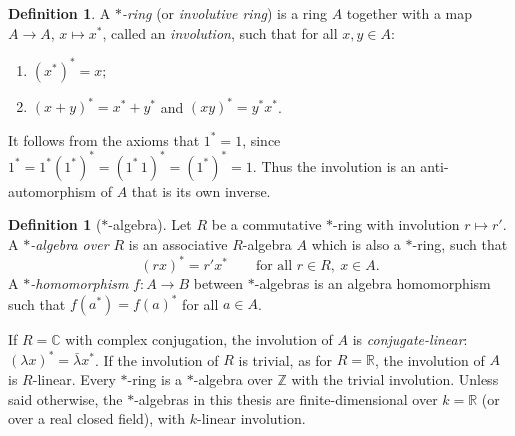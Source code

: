\documentclass[12pt, a4paper]{report}
\theoremstyle{plain}
\theoremstyle{definition}
\newtheorem{definition}[theorem]{Definition}
\theoremstyle{remark}
\theoremstyle{plain}
\newcommand{\staralg}[0]{$*$-algebra}
\newcommand{\starring}[0]{$*$-ring}
\newcommand{\RR}{\mathbb{R}}
\newcommand{\CC}{\mathbb{C}}
\newcommand{\ZZ}{\mathbb{Z}}
\begin{document}
\begin{definition}\label{def:starring}
A \emph{\starring} (or \emph{involutive ring}) is a ring $A$ together with a map $A\to A$, $x\mapsto x^*$, called an \emph{involution}, such that for all $x,y\in A$:
\begin{enumerate}
    \item $(x^*)^* = x$;
    \item $(x + y)^* = x^* + y^*$ and $(xy)^* = y^*x^*$.
\end{enumerate}
\end{definition}

It follows from the axioms that $1^*=1$, since $1^*=1^*(1^*)^*=(1^*\,1)^*=(1^*)^*=1$. Thus the involution is an anti-automorphism of $A$ that is its own inverse.

\begin{definition}[$*$-algebra]\label{def:staralg}
Let $R$ be a commutative \starring{} with involution $r \mapsto r'$. A \emph{\staralg{} over $R$} is an associative $R$-algebra $A$ which is also a \starring{}, such that
\[(rx)^* = r'x^* \qquad\text{for all } r\in R,\ x\in A.\]
A \emph{$*$-homomorphism} $f: A \to B$ between $*$-algebras is an algebra homomorphism such that $f(a^*) = f(a)^*$ for all $a \in A$.
\end{definition}

If $R=\CC$ with complex conjugation, the involution of $A$ is \emph{conjugate-linear}: $(\lambda x)^*=\bar\lambda x^*$. If the involution of $R$ is trivial, as for $R=\RR$, the involution of $A$ is $R$-linear. Every \starring{} is a \staralg{} over $\ZZ$ with the trivial involution. Unless said otherwise, the $*$-algebras in this thesis are finite-dimensional over $k=\RR$ (or over a real closed field), with $k$-linear involution.
\end{document}
